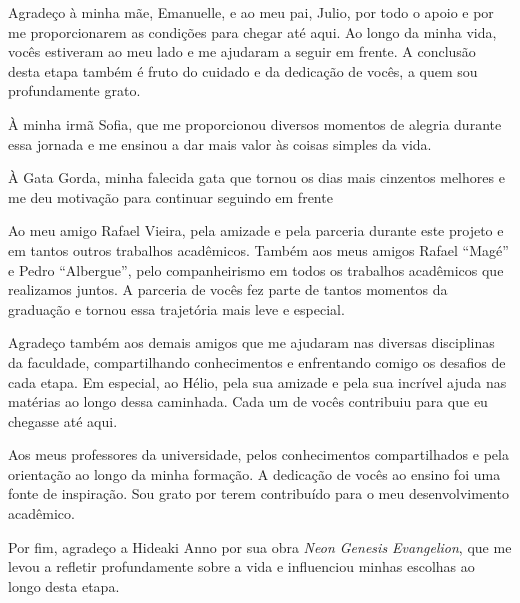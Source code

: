 Agradeço à minha mãe, Emanuelle, e ao meu pai, Julio, por todo o apoio e por me proporcionarem as condições para chegar até aqui. Ao longo da minha vida, vocês estiveram ao meu lado e me ajudaram a seguir em frente. A conclusão desta etapa também é fruto do cuidado e da dedicação de vocês, a quem sou profundamente grato.

À minha irmã Sofia, que me proporcionou diversos momentos de alegria durante essa jornada e me ensinou a dar mais valor às coisas simples da vida.

À Gata Gorda, minha falecida gata que tornou os dias mais cinzentos melhores e me deu motivação para continuar seguindo em frente 

Ao meu amigo Rafael Vieira, pela amizade e pela parceria durante este projeto e em tantos outros trabalhos acadêmicos. Também aos meus amigos Rafael ``Magé'' e Pedro ``Albergue'', pelo companheirismo em todos os trabalhos acadêmicos que realizamos juntos. A parceria de vocês fez parte de tantos momentos da graduação e tornou essa trajetória mais leve e especial.

Agradeço também aos demais amigos que me ajudaram nas diversas disciplinas da faculdade, compartilhando conhecimentos e enfrentando comigo os desafios de cada etapa. Em especial, ao Hélio, pela sua amizade e pela sua incrível ajuda nas matérias ao longo dessa caminhada. Cada um de vocês contribuiu para que eu chegasse até aqui.

Aos meus professores da universidade, pelos conhecimentos compartilhados e pela orientação ao longo da minha formação. A dedicação de vocês ao ensino foi uma fonte de inspiração. Sou grato por terem contribuído para o meu desenvolvimento acadêmico.

Por fim, agradeço a Hideaki Anno por sua obra \textit{Neon Genesis Evangelion}, que me levou a refletir profundamente sobre a vida e influenciou minhas escolhas ao longo desta etapa.